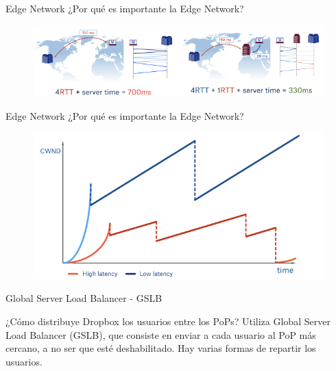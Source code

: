 \documentclass[10pt]{beamer}
\begin{document}
\begin{frame}{Edge Network}
\alert{¿Por qué es importante la Edge Network?}
\begin{figure}[h]
  \centering
  \includegraphics[width=1\linewidth]{pop3}
\end{figure}

\end{frame}
\begin{frame}{Edge Network}
\alert{¿Por qué es importante la Edge Network?}
\begin{figure}[h]
  \centering
  \includegraphics[width=1\linewidth]{pop4}
\end{figure}

\end{frame}

\begin{frame}{Global Server Load Balancer - GSLB}
\begin{alertblock}{¿Cómo distribuye Dropbox los usuarios entre los PoPs?}
Utiliza Global Server Load Balancer (GSLB), que consiste en enviar a cada usuario al PoP más cercano, a no ser que esté deshabilitado. Hay varias formas de repartir los usuarios.
\end{alertblock}

\end{frame}
\end{document}
